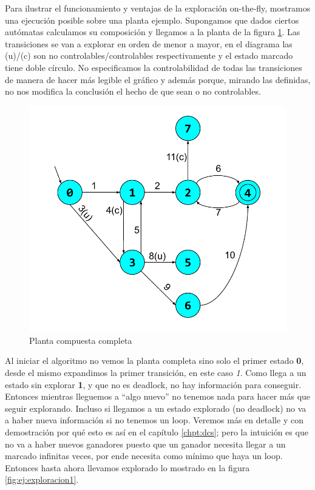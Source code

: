 Para ilustrar el funcionamiento y ventajas de la exploración on-the-fly, mostramos una ejecución posible sobre una planta ejemplo. Supongamos que dados ciertos autómatas calculamos su composición y llegamos a la planta de la figura \ref{fig:ej:plantaCompleta}. Las transiciones se van a explorar en orden de menor a mayor, en el diagrama las (u)/(c) son no controlables/controlables respectivamente y el estado marcado tiene doble círculo. No especificamos la controlabilidad de todas las transiciones de manera de hacer más legible el gráfico y además porque, mirando las definidas, no nos modifica la conclusión el hecho de que sean o no controlables. %

\begin{figure}
 \centering
 \includegraphics[scale=0.6]{figures/ejemplo_on-the-fly/0.pdf}
 \caption{Planta compuesta completa}
 \label{fig:ej:plantaCompleta}
\end{figure}

Al iniciar el algoritmo no vemos la planta completa sino solo el primer estado \textbf{0}, desde el mismo expandimos la primer transición, en este caso \textit{1}. Como llega a un estado sin explorar \textbf{1}, y que no es deadlock, no hay información para conseguir. Entonces mientras lleguemos a ``algo nuevo'' no tenemos nada para hacer más que seguir explorando.
Incluso si llegamos a un estado explorado (no deadlock) no va a haber nueva información si no tenemos un loop. Veremos más en detalle y con demostración por qué esto es así en el capítulo \ref{chpt:dcs}; pero la intuición es que no va a haber nuevos ganadores puesto que un ganador necesita llegar a un marcado infinitas veces, por ende necesita como mínimo que haya un loop. Entonces hasta ahora llevamos explorado lo mostrado en la figura \ref{fig:ej:exploracion1}.


